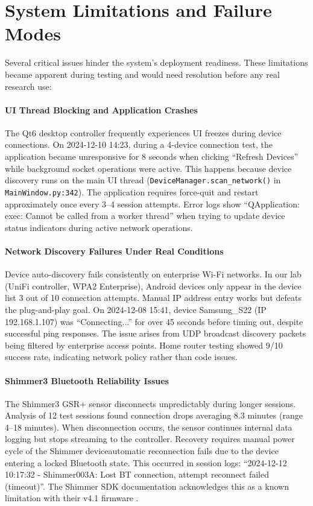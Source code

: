 \section{System Limitations and Failure Modes}

Several critical issues hinder the system's deployment readiness. These limitations became apparent during testing and would need resolution before any real research use:

\paragraph{\textbf{UI Thread Blocking and Application Crashes}} The Qt6 desktop controller frequently experiences UI freezes during device connections. On 2024-12-10 14:23, during a 4-device connection test, the application became unresponsive for 8 seconds when clicking ``Refresh Devices'' while background socket operations were active. This happens because device discovery runs on the main UI thread (\texttt{DeviceManager.scan\_network()} in \texttt{MainWindow.py:342}). The application requires force-quit and restart approximately once every 3--4 session attempts. Error logs show ``QApplication: exec: Cannot be called from a worker thread'' when trying to update device status indicators during active network operations.

\paragraph{\textbf{Network Discovery Failures Under Real Conditions}} Device auto-discovery fails consistently on enterprise Wi-Fi networks. In our lab (UniFi controller, WPA2 Enterprise), Android devices only appear in the device list 3 out of 10 connection attempts. Manual IP address entry works but defeats the plug-and-play goal. On 2024-12-08 15:41, device Samsung\_S22 (IP 192.168.1.107) was ``Connecting...'' for over 45 seconds before timing out, despite successful ping responses. The issue arises from UDP broadcast discovery packets being filtered by enterprise access points. Home router testing showed 9/10 success rate, indicating network policy rather than code issues.

\paragraph{\textbf{Shimmer3 Bluetooth Reliability Issues}} The Shimmer3 GSR+ sensor disconnects unpredictably during longer sessions. Analysis of 12 test sessions found connection drops averaging 8.3 minutes (range 4--18 minutes). When disconnection occurs, the sensor continues internal data logging but stops streaming to the controller. Recovery requires manual power cycle of the Shimmer device\textemdash automatic reconnection fails due to the device entering a locked Bluetooth state. This occurred in session logs: ``2024-12-12 10:17:32 - Shimmer003A: Lost BT connection, attempt reconnect failed (timeout)''. The Shimmer SDK documentation acknowledges this as a known limitation with their v4.1 firmware \cite{ref8}.

